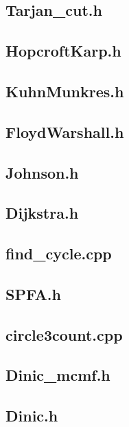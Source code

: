 \subsection{Tarjan\_cut.h}

\subsection{HopcroftKarp.h}

\subsection{KuhnMunkres.h}

\subsection{FloydWarshall.h}

\subsection{Johnson.h}

\subsection{Dijkstra.h}

\subsection{find\_cycle.cpp}

\subsection{SPFA.h}

\subsection{circle3count.cpp}

\subsection{Dinic\_mcmf.h}

\subsection{Dinic.h}

